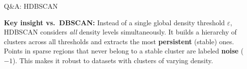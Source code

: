 \documentclass[aspectratio=169]{beamer}
\begin{document}
\begin{frame}{Q\&A: HDBSCAN}

\vspace{0.3cm}
\begin{tcolorbox}[colback=metalight, colframe=metablue, boxrule=0.5pt, arc=4pt,
    left=4pt, right=4pt, top=3pt, bottom=3pt]
\small
\textbf{Key insight vs.\ DBSCAN:} Instead of a single global density threshold $\varepsilon$, HDBSCAN considers \emph{all} density levels simultaneously. It builds a hierarchy of clusters across all thresholds and extracts the most \textbf{persistent} (stable) ones. Points in sparse regions that never belong to a stable cluster are labeled \textbf{noise} ($-1$). This makes it robust to datasets with clusters of varying density.
\end{tcolorbox}
\end{frame}
\end{document}

